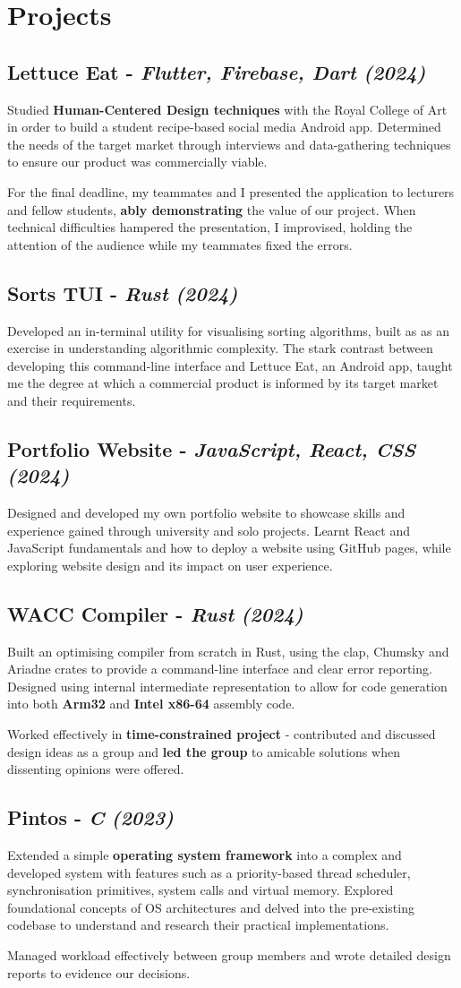 \documentclass{article}
\newcommand{\dates}[1]{\hfill\textit{(#1)}}
\newcommand{\indentedblock}[1]{
    \hfill
    \begin{minipage}{\dimexpr\textwidth - 0.65cm}
        #1
    \end{minipage}
}
\newcommand{\project}[4]{
    \subsection*{\textbf{#1} - \textit{#3} \dates{#2}}
    \indentedblock{#4}
}
\begin{document}
\section*{Projects}

\project{Lettuce Eat }{2024}{Flutter, Firebase, Dart}{
    Studied \textbf{Human-Centered Design techniques} with the Royal College of Art in order to build a student recipe-based social media Android app.
    Determined the needs of the target market through interviews and data-gathering techniques to ensure our product was commercially viable.

    For the final deadline, my teammates and I presented the application to lecturers and fellow students, \textbf{ably demonstrating}
    the value of our project. When technical difficulties hampered the presentation, I improvised, holding the attention of the audience
    while my teammates fixed the errors.
}

\project{Sorts TUI}{2024}{Rust}{
    Developed an in-terminal utility for visualising sorting algorithms, built as as an exercise in understanding algorithmic complexity.
    The stark contrast between developing this command-line interface and Lettuce Eat, an Android app, taught me the degree at which 
    a commercial product is informed by its target market and their requirements.
}

\project{Portfolio Website}{2024}{JavaScript, React, CSS}{
    Designed and developed my own portfolio website to showcase skills and experience gained through university and solo projects.
    Learnt React and JavaScript fundamentals and how to deploy a website using GitHub pages, while exploring website design and its impact on 
    user experience.
}

\project{WACC Compiler }{2024}{Rust}{
    Built an optimising compiler from scratch in Rust, using the clap, Chumsky and Ariadne crates to provide a command-line interface
    and clear error reporting. Designed using internal intermediate representation to allow for code generation into both
    \textbf{Arm32} and \textbf{Intel x86-64} assembly code.
 
    Worked effectively in \textbf{time-constrained project} - contributed and discussed design ideas as a group and \textbf{led the group} to 
    amicable solutions when dissenting opinions were offered. 
}

\project{Pintos }{2023}{C}{
    Extended a simple \textbf{operating system framework} into a complex and developed system with features such as a priority-based thread scheduler, 
    synchronisation primitives, system calls and virtual memory. Explored foundational concepts of OS architectures and delved into the
    pre-existing codebase to understand and research their practical implementations. 
 
    Managed workload effectively between group members and wrote detailed design reports to evidence our decisions. 
}
\end{document}
